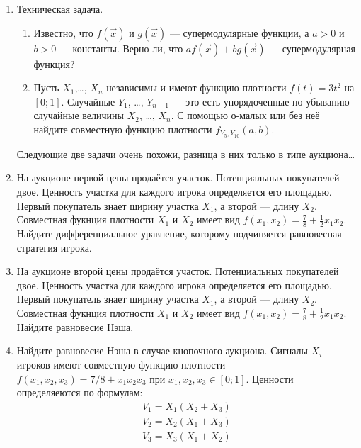 \begin{enumerate}

\item Техническая задача.
\begin{enumerate}
\item Известно, что $ f(\vec{x}) $ и $ g(\vec{x}) $ — супермодулярные функции, а $ a>0 $ и $ b>0 $ — константы. Верно ли, что $ af(\vec{x})+bg(\vec{x}) $ — супермодулярная функция?

\item Пусть $ X_{1} $,\ldots, $ X_{n} $ независимы и имеют функцию плотности $ f(t)=3t^{2} $ на $ [0;1] $. Случайные $ Y_{1} $, \ldots, $ Y_{n-1} $ — это есть упорядоченные по убыванию случайные величины $ X_{2} $, \ldots, $ X_{n} $. С помощью о-малых или без неё найдите совместную функцию плотности $ f_{Y_{5},Y_{10}}(a,b) $.
\end{enumerate}

Следующие две задачи очень похожи, разница в них только в типе аукциона\ldots

\item На аукционе первой цены продаётся участок. Потенциальных покупателей двое. Ценность участка для каждого игрока определяется его площадью. Первый покупатель знает ширину участка $ X_{1} $, а второй — длину $X_{2}$. Совместная фукнция плотности $ X_{1} $ и $ X_{2} $ имеет вид $ f(x_{1},x_{2})=\frac{7}{8}+\frac{1}{2}x_{1}x_{2} $. Найдите дифференциальное уравнение, которому подчиняется равновесная стратегия игрока.

\item На аукционе второй цены продаётся участок. Потенциальных покупателей двое. Ценность участка для каждого игрока определяется его площадью. Первый покупатель знает ширину участка $ X_{1} $, а второй — длину $X_{2}$. Совместная фукнция плотности $ X_{1} $ и $ X_{2} $ имеет вид $ f(x_{1},x_{2})=\frac{7}{8}+\frac{1}{2}x_{1}x_{2} $. Найдите равновесие Нэша.


\item Найдите равновесие Нэша в случае кнопочного аукциона. Сигналы $ X_{i} $ игроков имеют совместную функцию плотности $ f(x_{1},x_{2},x_{3})=7/8+x_{1}x_{2}x_{3} $ при $ x_{1},x_{2},x_{3}\in[0;1] $. Ценности определяеются по формулам:
\begin{equation}
\begin{array}{c}
V_{1}=X_{1}(X_{2}+X_{3}) \\
V_{2}=X_{2}(X_{1}+X_{3}) \\
V_{3}=X_{3}(X_{1}+X_{2})
\end{array}
\end{equation}



\end{enumerate}
